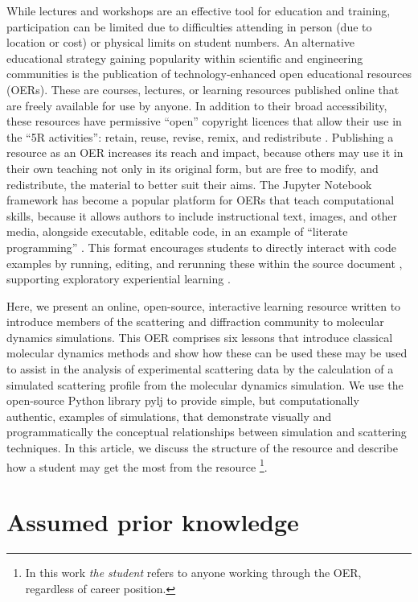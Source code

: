 \documentclass[amsmath,amssymb,twocolumn,superscriptaddress]{revtex4-1}
\begin{document}
While lectures and workshops are an effective tool for education and training, participation can be limited due to difficulties attending in person (due to location or cost) or physical limits on student numbers.
An alternative educational strategy gaining popularity within scientific and engineering communities is the publication of technology-enhanced open educational resources (OERs).
These are courses, lectures, or learning resources published online that are freely available for use by anyone. In addition to their broad accessibility, these resources have permissive ``open'' copyright licences that allow their use in the ``5R activities'': retain, reuse, revise, remix, and redistribute \cite{wiley_open_2018}.
Publishing a resource as an OER increases its reach and impact, because others may use it in their own teaching not only in its original form, but are free to modify, and redistribute, the material to better suit their aims.
The Jupyter Notebook framework \cite{kluyver_jupyter_2016} has become a popular platform for OERs that teach computational skills, because it allows authors to include instructional text, images, and other media, alongside executable, editable code, in an example of ``literate programming'' \cite{knuth_literate_1984}.
This format encourages students to directly interact with code examples by running, editing, and rerunning these within the source document \cite{barba_cybertraining_2017}, supporting exploratory experiential learning \cite{papert_mindstroms_1993}.

Here, we present an online, open-source, interactive learning resource written to introduce members of the scattering and diffraction community to molecular dynamics simulations.
This OER comprises six lessons that introduce classical molecular dynamics methods and show how these can be used these may be used to assist in the analysis of experimental scattering data by the calculation of a simulated scattering profile from the molecular dynamics simulation.
We use the open-source Python library pylj \cite{mccluskey_pylj_2018} to provide simple, but computationally authentic, examples of simulations, that demonstrate visually and programmatically the conceptual relationships between simulation and scattering techniques.
In this article, we discuss the structure of the resource and describe how a student may get the most from the resource \footnote{In this work \emph{the student} refers to anyone working through the OER, regardless of career position.}.

\section{Assumed prior knowledge}
\end{document}
